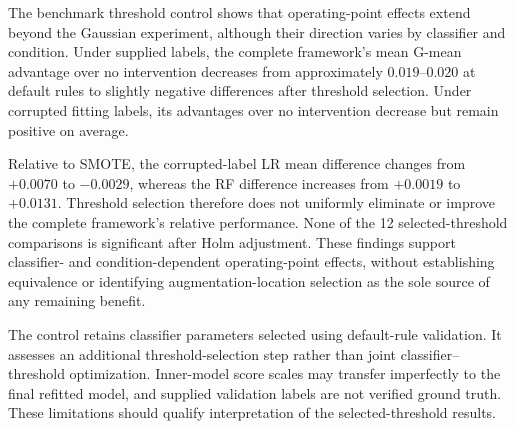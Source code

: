The benchmark threshold control shows that operating-point effects extend beyond the Gaussian experiment, although their direction varies by classifier and condition. Under supplied labels, the complete framework's mean G-mean advantage over no intervention decreases from approximately $0.019$--$0.020$ at default rules to slightly negative differences after threshold selection. Under corrupted fitting labels, its advantages over no intervention decrease but remain positive on average.

Relative to SMOTE, the corrupted-label LR mean difference changes from $+0.0070$ to $-0.0029$, whereas the RF difference increases from $+0.0019$ to $+0.0131$. Threshold selection therefore does not uniformly eliminate or improve the complete framework's relative performance. None of the 12 selected-threshold comparisons is significant after Holm adjustment. These findings support classifier- and condition-dependent operating-point effects, without establishing equivalence or identifying augmentation-location selection as the sole source of any remaining benefit.

The control retains classifier parameters selected using default-rule validation. It assesses an additional threshold-selection step rather than joint classifier--threshold optimization. Inner-model score scales may transfer imperfectly to the final refitted model, and supplied validation labels are not verified ground truth. These limitations should qualify interpretation of the selected-threshold results.
